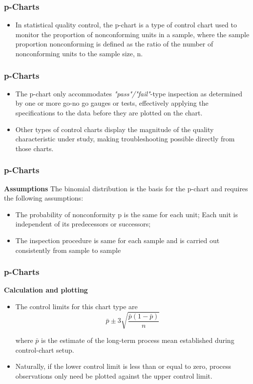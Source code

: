 \documentclass[Charts101.tex]{subfiles}
\begin{document}
	\begin{frame}
		\frametitle{p-Charts}	
		\large
		\begin{itemize}
			\item
In statistical quality control, the p-chart is a type of control chart used to monitor the proportion of nonconforming units in a sample, where the sample proportion nonconforming is defined as the ratio of the number of nonconforming units to the sample size, n.
\end{itemize}
\end{frame}
\begin{frame}
	\frametitle{p-Charts}
	\Large
\begin{itemize}
\item The p-chart only accommodates \textit{"pass"/"fail"}-type inspection as determined by one or more go-no go gauges or tests, effectively applying the specifications to the data before they are plotted on the chart. 
\item Other types of control charts display the magnitude of the quality characteristic under study, making troubleshooting possible directly from those charts.

\end{itemize}

\end{frame}
\begin{frame}
	\frametitle{p-Charts}
	\Large
\textbf{Assumptions}
The binomial distribution is the basis for the p-chart and requires the following assumptions:
\begin{itemize}


\item The probability of nonconformity p is the same for each unit;
Each unit is independent of its predecessors or successors;
\item The inspection procedure is same for each sample and is carried out consistently from sample to sample
\end{itemize}


\end{frame}
\begin{frame}
	\frametitle{p-Charts}
	\Large
\textbf{Calculation and plotting}\\
\begin{itemize}
\item The control limits for this chart type are \[\bar{p} \pm 3\sqrt{\frac{\bar{p}(1-\bar{p})}{n}} \]

where $\bar{p}$ is the estimate of the long-term process mean established during control-chart setup.
\item Naturally, if the lower control limit is less than or equal to zero, process observations only need be plotted against the upper control limit. 
\end{itemize}
\end{frame}
\end{document}
